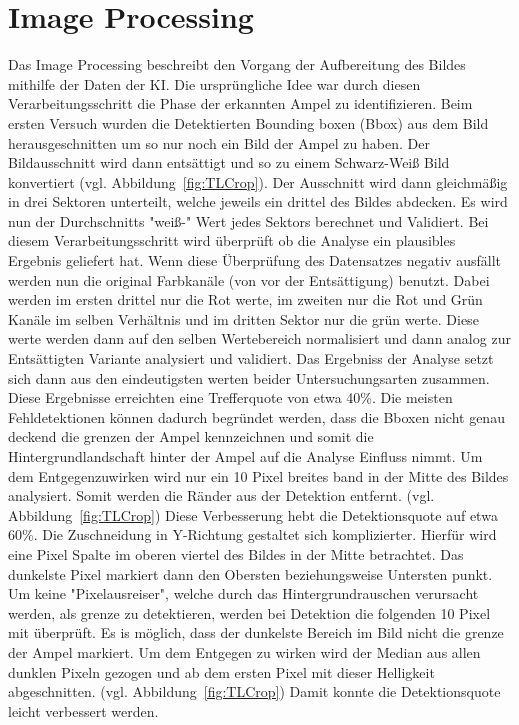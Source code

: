 \documentclass[a4paper,oneside,12pt]{report}
\begin{document}
	\chapter{Image Processing}
	\begin{onehalfspace}
		Das Image Processing beschreibt den Vorgang der Aufbereitung des Bildes mithilfe der Daten der KI. Die ursprüngliche Idee war durch diesen Verarbeitungsschritt die Phase der erkannten Ampel zu identifizieren. \newline 
		Beim ersten Versuch wurden die Detektierten Bounding boxen (Bbox) aus dem Bild herausgeschnitten um so nur noch ein Bild der Ampel zu haben. Der Bildausschnitt wird dann entsättigt und so zu einem Schwarz-Weiß Bild konvertiert (vgl. Abbildung~\ref{fig:TLCrop}). Der Ausschnitt wird dann gleichmäßig in drei Sektoren unterteilt, welche jeweils ein drittel des Bildes abdecken. Es wird nun der Durchschnitts "weiß-" Wert jedes Sektors berechnet und Validiert. Bei diesem Verarbeitungsschritt wird überprüft ob die Analyse ein plausibles Ergebnis geliefert hat. Wenn diese Überprüfung des Datensatzes negativ ausfällt werden nun die original Farbkanäle (von vor der Entsättigung) benutzt. Dabei werden im ersten drittel nur die Rot werte, im zweiten nur die Rot und Grün Kanäle im selben Verhältnis und im dritten Sektor nur die grün werte. Diese werte werden dann auf den selben Wertebereich normalisiert und dann analog zur Entsättigten Variante analysiert und validiert. Das Ergebniss der Analyse setzt sich dann aus den eindeutigsten werten beider Untersuchungsarten zusammen. \newline
		Diese Ergebnisse erreichten eine Trefferquote von etwa 40\%. Die meisten Fehldetektionen können dadurch begründet werden, dass die Bboxen nicht genau deckend die grenzen der Ampel kennzeichnen und somit die Hintergrundlandschaft hinter der Ampel auf die Analyse Einfluss nimmt. Um dem Entgegenzuwirken wird nur ein 10 Pixel breites band in der Mitte des Bildes analysiert. Somit werden die Ränder aus der Detektion entfernt. (vgl. Abbildung~\ref{fig:TLCrop}) Diese Verbesserung hebt die Detektionsquote auf etwa 60\%.\newline
		Die Zuschneidung in Y-Richtung gestaltet sich komplizierter. Hierfür wird eine Pixel Spalte im oberen viertel des Bildes in der Mitte betrachtet. Das dunkelste Pixel markiert dann den Obersten beziehungsweise Untersten punkt. Um keine "Pixelausreiser", welche durch das Hintergrundrauschen verursacht werden, als grenze zu detektieren, werden bei Detektion die folgenden 10 Pixel mit überprüft. Es is möglich, dass der dunkelste Bereich im Bild nicht die grenze der Ampel markiert. Um dem Entgegen zu wirken wird der Median aus allen dunklen Pixeln gezogen und ab dem ersten Pixel mit dieser Helligkeit abgeschnitten. (vgl. Abbildung~\ref{fig:TLCrop}) Damit konnte die Detektionsquote leicht verbessert werden.\newline

\end{onehalfspace}
\end{document}
